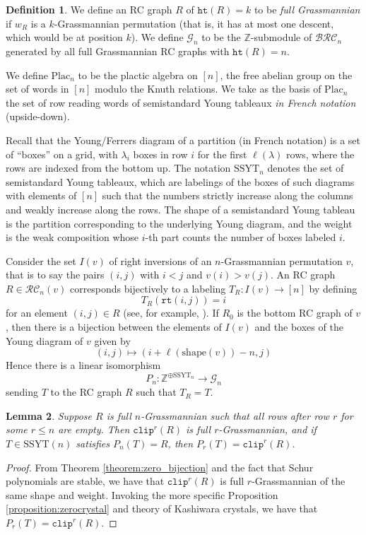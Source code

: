 \documentclass{amsart}
\newtheorem{lemma}{Lemma}[subsection]
\theoremstyle{definition}
\newtheorem{definition}[lemma]{Definition}
\theoremstyle{remark}
\numberwithin{equation}{subsection}
\newcommand{\wof}[1]{w_{#1}}
\newcommand{\grass}{\mathcal{G}}
\newcommand{\plac}{\mathrm{Plac}}
\newcommand{\rtt}{\mathtt{rt}}
\newcommand{\hr}{\mathtt{ht}}
\newcommand{\clp}{\mathtt{clip}}
\newcommand{\BRC}{\mathcal{BRC}}
\newcommand{\RC}{\mathcal{RC}}
\newcommand{\SSYT}{\mathrm{SSYT}}
\begin{document}
\begin{definition}
We define an RC graph $R$ of $\hr(R)=k$ to be \emph{full Grassmannian} if $\wof{R}$ is a $k$-Grassmannian permutation (that is, it has at most one descent, which would be at position $k$). We define $\grass_n$ to be the $\mathbb{Z}$-submodule of $\BRC_n$ generated by all full Grassmannian RC graphs with $\hr(R)= n$.

We define $\plac_n$ to be the plactic algebra on $[n]$, the free abelian group on the set of words in $[n]$ modulo the Knuth relations. We take as the basis of $\plac_n$ the set of row reading words of semistandard Young tableaux \emph{in French notation} (upside-down).

Recall that the Young/Ferrers diagram of a partition (in French notation) is a set of ``boxes'' on a grid, with $\lambda_i$ boxes in row $i$ for the first $\ell(\lambda)$ rows, where the rows are indexed from the bottom up. The notation $\mathrm{SSYT}_n$ denotes the set of semistandard Young tableaux, which are labelings of the boxes of such diagrams with elements of $[n]$ such that the numbers strictly increase along the columns and weakly increase along the rows. The shape of a semistandard Young tableau is the partition corresponding to the underlying Young diagram, and the weight is the weak composition whose $i$-th part counts the number of boxes labeled $i$.

Consider the set $I(v)$ of right inversions of an $n$-Grassmannian permutation $v$, that is to say the pairs $(i,j)$ with $i<j$ and $v(i)>v(j)$. An RC graph $R\in\RC_n(v)$ corresponds bijectively to a labeling $T_R:I(v)\to [n]$ by defining
$$T_R(\rtt(i,j)) = i$$
for an element $(i,j)\in R$ (see, for example, \cite{axelrodfreed2025inversionstableaux}). If $R_0$ is the bottom RC graph of $v$, then there is a bijection between the elements of $I(v)$ and the boxes of the Young diagram of $v$ given by
$$(i,j) \mapsto (i + \ell(\mathrm{shape}(v)) - n, j)$$
Hence there is a linear isomorphism
$$P_n:\mathbb{Z}^{\oplus\mathrm{SSYT}_n}\to \grass_n$$
sending $T$ to the RC graph $R$ such that $T_R = T$.
\end{definition}

\begin{lemma}
Suppose $R$ is full $n$-Grassmannian such that all rows after row $r$ for some $r\leq n$ are empty. Then $\clp^r(R)$ is full $r$-Grassmannian, and if $T\in \SSYT(n)$ satisfies $P_n(T)=R$, then $P_r(T)=\clp^r(R)$.
\end{lemma}
\begin{proof}
From Theorem \ref{theorem:zero_bijection} and the fact that Schur polynomials are stable, we have that $\clp^r(R)$ is full $r$-Grassmannian of the same shape and weight. Invoking the more specific Proposition \ref{proposition:zerocrystal} and theory of Kashiwara crystals, we have that $P_r(T)=\clp^r(R)$.
\end{proof}
\end{document}
